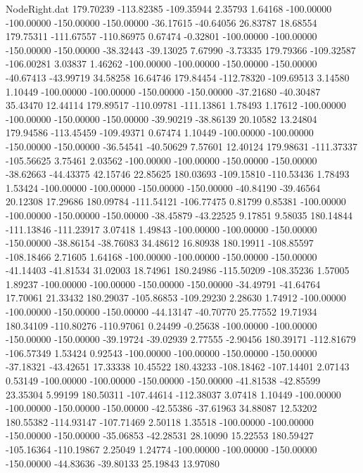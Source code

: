 \begin{filecontents}{NodeRight.dat}
 179.70239 -113.82385 -109.35944     2.35793    1.64168 -100.00000 -100.00000 -150.00000 -150.00000  -36.17615  -40.64056   26.83787   18.68554
 179.75311 -111.67557 -110.86975     0.67474   -0.32801 -100.00000 -100.00000 -150.00000 -150.00000  -38.32443  -39.13025    7.67990   -3.73335
 179.79366 -109.32587 -106.00281     3.03837    1.46262 -100.00000 -100.00000 -150.00000 -150.00000  -40.67413  -43.99719   34.58258   16.64746
 179.84454 -112.78320 -109.69513     3.14580    1.10449 -100.00000 -100.00000 -150.00000 -150.00000  -37.21680  -40.30487   35.43470   12.44114
 179.89517 -110.09781 -111.13861     1.78493    1.17612 -100.00000 -100.00000 -150.00000 -150.00000  -39.90219  -38.86139   20.10582   13.24804
 179.94586 -113.45459 -109.49371     0.67474    1.10449 -100.00000 -100.00000 -150.00000 -150.00000  -36.54541  -40.50629    7.57601   12.40124
 179.98631 -111.37337 -105.56625     3.75461    2.03562 -100.00000 -100.00000 -150.00000 -150.00000  -38.62663  -44.43375   42.15746   22.85625
 180.03693 -109.15810 -110.53436     1.78493    1.53424 -100.00000 -100.00000 -150.00000 -150.00000  -40.84190  -39.46564   20.12308   17.29686
 180.09784 -111.54121 -106.77475     0.81799    0.85381 -100.00000 -100.00000 -150.00000 -150.00000  -38.45879  -43.22525    9.17851    9.58035
 180.14844 -111.13846 -111.23917     3.07418    1.49843 -100.00000 -100.00000 -150.00000 -150.00000  -38.86154  -38.76083   34.48612   16.80938
 180.19911 -108.85597 -108.18466     2.71605    1.64168 -100.00000 -100.00000 -150.00000 -150.00000  -41.14403  -41.81534   31.02003   18.74961
 180.24986 -115.50209 -108.35236     1.57005    1.89237 -100.00000 -100.00000 -150.00000 -150.00000  -34.49791  -41.64764   17.70061   21.33432
 180.29037 -105.86853 -109.29230     2.28630    1.74912 -100.00000 -100.00000 -150.00000 -150.00000  -44.13147  -40.70770   25.77552   19.71934
 180.34109 -110.80276 -110.97061     0.24499   -0.25638 -100.00000 -100.00000 -150.00000 -150.00000  -39.19724  -39.02939    2.77555   -2.90456
 180.39171 -112.81679 -106.57349     1.53424    0.92543 -100.00000 -100.00000 -150.00000 -150.00000  -37.18321  -43.42651   17.33338   10.45522
 180.43233 -108.18462 -107.14401     2.07143    0.53149 -100.00000 -100.00000 -150.00000 -150.00000  -41.81538  -42.85599   23.35304    5.99199
 180.50311 -107.44614 -112.38037     3.07418    1.10449 -100.00000 -100.00000 -150.00000 -150.00000  -42.55386  -37.61963   34.88087   12.53202
 180.55382 -114.93147 -107.71469     2.50118    1.35518 -100.00000 -100.00000 -150.00000 -150.00000  -35.06853  -42.28531   28.10090   15.22553
 180.59427 -105.16364 -110.19867     2.25049    1.24774 -100.00000 -100.00000 -150.00000 -150.00000  -44.83636  -39.80133   25.19843   13.97080

\end{filecontents}
